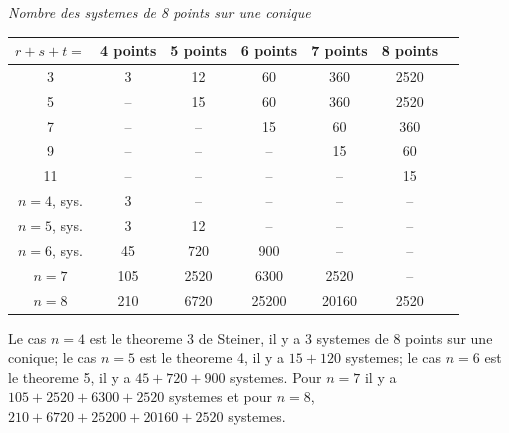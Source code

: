 \documentclass[11pt,a4paper]{article}
\theoremstyle{plain}
\begin{document}
\begin{center}
\textit{Nombre des systemes de 8 points sur une conique}
\end{center}

\begin{center}
\begin{tabular}{c|cccccc}
$r+s+t=$ & 4 points & 5 points & 6 points & 7 points & 8 points \\
\hline
3  & 3 & 12 & 60 & 360 & 2520 \\
5  & -- & 15 & 60 & 360 & 2520 \\
7  & -- & -- & 15 & 60 & 360 \\
9  & -- & -- & -- & 15 & 60 \\
11 & -- & -- & -- & -- & 15 \\
\hline
$n=4$, sys. & 3 & -- & -- & -- & -- \\
$n=5$, sys. & 3 & 12 & -- & -- & -- \\
$n=6$, sys. & 45 & 720 & 900 & -- & -- \\
$n=7$       & 105 & 2520 & 6300 & 2520 & -- \\
$n=8$       & 210 & 6720 & 25200 & 20160 & 2520 \\
\end{tabular}
\end{center}

Le cas $n=4$ est le theoreme 3 de Steiner, il y a 3 systemes de 8 points sur une conique; le cas $n=5$ est le theoreme 4, il y a $15 + 120$ systemes; le cas $n=6$ est le theoreme 5, il y a $45 + 720 + 900$ systemes. Pour $n=7$ il y a $105 + 2520 + 6300 + 2520$ systemes et pour $n=8$, $210 + 6720 + 25200 + 20160 + 2520$ systemes.
\end{document}
